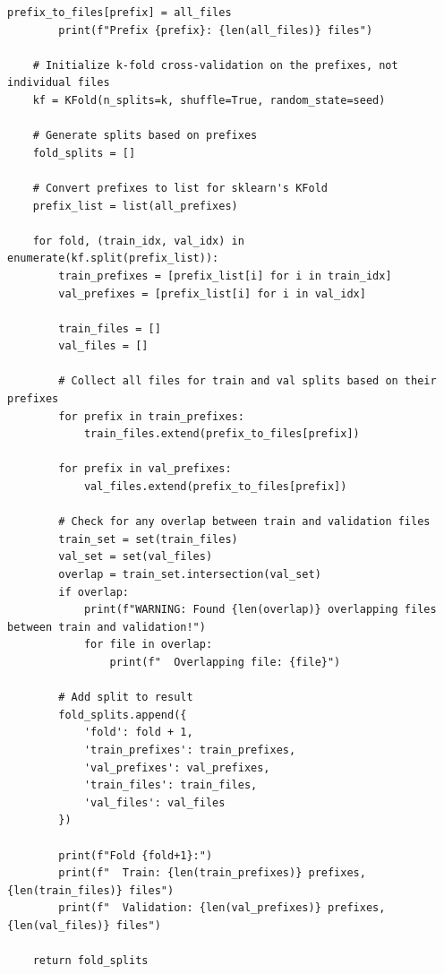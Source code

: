\begin{lstlisting}[caption={Membuat pembagian K-Fold}, label={kode:generate k-fold}]
        prefix_to_files[prefix] = all_files
        print(f"Prefix {prefix}: {len(all_files)} files")
    
    # Initialize k-fold cross-validation on the prefixes, not individual files
    kf = KFold(n_splits=k, shuffle=True, random_state=seed)
    
    # Generate splits based on prefixes
    fold_splits = []
    
    # Convert prefixes to list for sklearn's KFold
    prefix_list = list(all_prefixes)
    
    for fold, (train_idx, val_idx) in enumerate(kf.split(prefix_list)):
        train_prefixes = [prefix_list[i] for i in train_idx]
        val_prefixes = [prefix_list[i] for i in val_idx]
        
        train_files = []
        val_files = []
        
        # Collect all files for train and val splits based on their prefixes
        for prefix in train_prefixes:
            train_files.extend(prefix_to_files[prefix])
        
        for prefix in val_prefixes:
            val_files.extend(prefix_to_files[prefix])
        
        # Check for any overlap between train and validation files
        train_set = set(train_files)
        val_set = set(val_files)
        overlap = train_set.intersection(val_set)
        if overlap:
            print(f"WARNING: Found {len(overlap)} overlapping files between train and validation!")
            for file in overlap:
                print(f"  Overlapping file: {file}")
        
        # Add split to result
        fold_splits.append({
            'fold': fold + 1,
            'train_prefixes': train_prefixes,
            'val_prefixes': val_prefixes,
            'train_files': train_files,
            'val_files': val_files
        })
        
        print(f"Fold {fold+1}:")
        print(f"  Train: {len(train_prefixes)} prefixes, {len(train_files)} files")
        print(f"  Validation: {len(val_prefixes)} prefixes, {len(val_files)} files")
    
    return fold_splits
\end{lstlisting}

\vspace{10pt}

